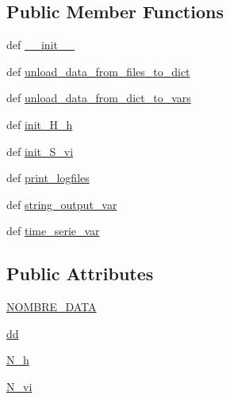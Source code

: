 \subsection*{Public Member Functions}
\begin{DoxyCompactItemize}
\item 
def \hyperlink{classdata__manager_1_1_data_manager_ac366e9ff1e60bbd9f1af6f03c16786be}{\-\_\-\-\_\-init\-\_\-\-\_\-}
\item 
def \hyperlink{classdata__manager_1_1_data_manager_a1ea4ae2852d3babf339d6b7b9b76ed4e}{unload\-\_\-data\-\_\-from\-\_\-files\-\_\-to\-\_\-dict}
\item 
def \hyperlink{classdata__manager_1_1_data_manager_a129a0af6efb1287dc5300f197091d238}{unload\-\_\-data\-\_\-from\-\_\-dict\-\_\-to\-\_\-vars}
\item 
def \hyperlink{classdata__manager_1_1_data_manager_aa60e6ad57d28146b4c7a5cdba7995313}{init\-\_\-\-H\-\_\-h}
\item 
def \hyperlink{classdata__manager_1_1_data_manager_a8052ab1fb1001bddc131a2fc890e2d0b}{init\-\_\-\-S\-\_\-vi}
\item 
def \hyperlink{classdata__manager_1_1_data_manager_a7b7b6b3233454cbf4ca1a23473d44bbd}{print\-\_\-logfiles}
\item 
def \hyperlink{classdata__manager_1_1_data_manager_ab88775ec4445d6271b5ae56083a18da5}{string\-\_\-output\-\_\-var}
\item 
def \hyperlink{classdata__manager_1_1_data_manager_aeb0578e88299929a3d7496be296cb63d}{time\-\_\-serie\-\_\-var}
\end{DoxyCompactItemize}
\subsection*{Public Attributes}
\begin{DoxyCompactItemize}
\item 
\hyperlink{classdata__manager_1_1_data_manager_ab9b39124c635d1e7babbb3459288d9d3}{N\-O\-M\-B\-R\-E\-\_\-\-D\-A\-T\-A}
\item 
\hyperlink{classdata__manager_1_1_data_manager_accbcc3f4e324250aa60e83d2b155b6ea}{dd}
\item 
\hyperlink{classdata__manager_1_1_data_manager_a4a37984bcecfc9866ee8f16a0c205d6e}{N\-\_\-h}
\item 
\hyperlink{classdata__manager_1_1_data_manager_addad06bf8294cb9e247cfb336402cd5e}{N\-\_\-vi}
\end{DoxyCompactItemize}


